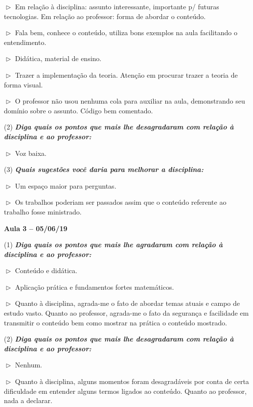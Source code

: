 \documentclass[
	12pt,				%
	openright,			%
	oneside,			%
	a4paper,			%
	chapter=TITLE,		%
	section=TITLE,		%
	english,			%
	french,				%
	spanish,			%
	brazil				%
	]{abntex2}
\begin{document}
$\vartriangleright$ Em relação à disciplina: assunto interessante, importante p/ futuras tecnologias. Em relação ao professor: forma de abordar o conteúdo.

$\vartriangleright$ Fala bem, conhece o conteúdo, utiliza bons exemplos na aula facilitando o entendimento.

$\vartriangleright$ Didática, material de ensino.

$\vartriangleright$ Trazer a implementação da teoria. Atenção em procurar trazer a teoria de forma visual.

$\vartriangleright$ O professor não usou nenhuma cola para auxiliar na aula, demonstrando seu domínio sobre o assunto. Código bem comentado.

(2) \textit{\textbf{Diga quais os pontos que mais lhe desagradaram com relação à disciplina e ao professor:}}

$\vartriangleright$ Voz baixa.

(3) \textit{\textbf{Quais sugestões você daria para melhorar a disciplina:}}

$\vartriangleright$ Um espaço maior para perguntas.

$\vartriangleright$ Os trabalhos poderiam ser passados assim que o conteúdo referente ao trabalho fosse ministrado.


\vspace{1cm}

\textbf{Aula 3 -- 05/06/19}

(1) \textit{\textbf{Diga quais os pontos que mais lhe agradaram com relação à disciplina e ao professor:}}

$\vartriangleright$ Conteúdo e didática.

$\vartriangleright$ Aplicação prática e fundamentos fortes matemáticos.

$\vartriangleright$ Quanto à disciplina, agrada-me o fato de abordar temas atuais e campo de estudo vasto. Quanto ao professor, agrada-me o fato da segurança e facilidade em transmitir o conteúdo bem como mostrar na prática o conteúdo mostrado.

(2) \textit{\textbf{Diga quais os pontos que mais lhe desagradaram com relação à disciplina e ao professor:}}

$\vartriangleright$ Nenhum.

$\vartriangleright$ Quanto à disciplina, alguns momentos foram desagradáveis por conta de certa dificuldade em entender alguns termos ligados ao conteúdo. Quanto ao professor, nada a declarar.
\end{document}
